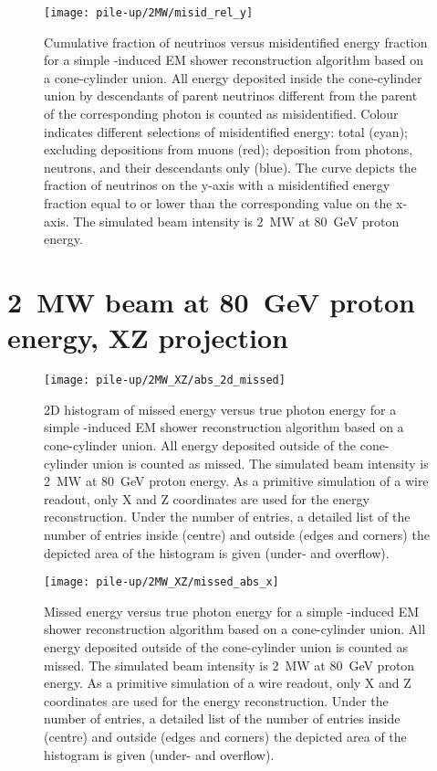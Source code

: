 \begin{figure}[htb]
	\centering
	\texttt{[image: pile-up/2MW/misid\_rel\_y]}
	\caption{Cumulative fraction of neutrinos versus misidentified energy fraction for a simple \Pgpz-induced EM shower reconstruction algorithm based on a cone-cylinder union.
		All energy deposited inside the cone-cylinder union by descendants of parent neutrinos different from the parent of the corresponding \Pgpz photon is counted as misidentified.
		Colour indicates different selections of misidentified energy: total (cyan); excluding depositions from muons (red); deposition from photons, neutrons, and their descendants only (blue).
		The curve depicts the fraction of neutrinos on the y-axis with a misidentified energy fraction equal to or lower than the corresponding value on the x-axis.
		The simulated beam intensity is \SI{2}{\mega\watt} at \SI{80}{\giga\electronvolt} proton energy.}
\end{figure}

\clearpage


\section{\SI{2}{\mega\watt} beam at \SI{80}{\giga\electronvolt} proton energy, XZ projection}

\begin{figure}[htb]
	\centering
	\texttt{[image: pile-up/2MW\_XZ/abs\_2d\_missed]}
	\caption{2D histogram of missed energy versus true photon energy for a simple \Pgpz-induced EM shower reconstruction algorithm based on a cone-cylinder union.
		All energy deposited outside of the cone-cylinder union is counted as missed.
		The simulated beam intensity is \SI{2}{\mega\watt} at \SI{80}{\giga\electronvolt} proton energy.
		As a primitive simulation of a wire readout, only X and Z coordinates are used for the energy reconstruction.
		Under the number of entries, a detailed list of the number of entries inside (centre) and outside (edges and corners) the depicted area of the histogram is given (under- and overflow).}
\end{figure}

\begin{figure}[htb]
	\centering
	\texttt{[image: pile-up/2MW\_XZ/missed\_abs\_x]}
	\caption{Missed energy versus true photon energy for a simple \Pgpz-induced EM shower reconstruction algorithm based on a cone-cylinder union.
		All energy deposited outside of the cone-cylinder union is counted as missed.
		The simulated beam intensity is \SI{2}{\mega\watt} at \SI{80}{\giga\electronvolt} proton energy.
		As a primitive simulation of a wire readout, only X and Z coordinates are used for the energy reconstruction.
		Under the number of entries, a detailed list of the number of entries inside (centre) and outside (edges and corners) the depicted area of the histogram is given (under- and overflow).}
\end{figure}

